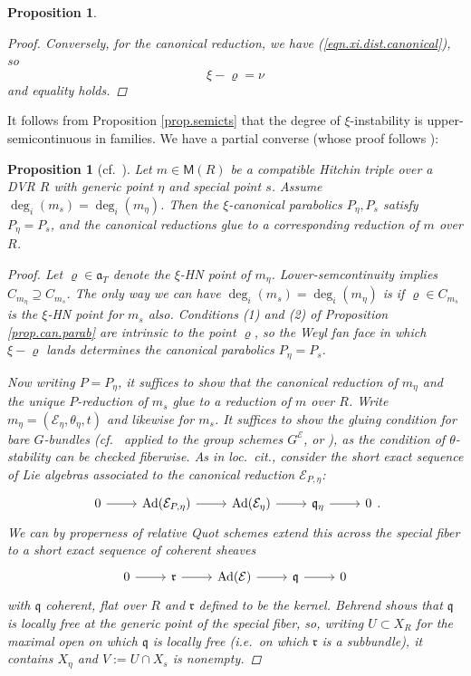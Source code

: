 \documentclass[openany]{amsbook}
\newtheorem{proposition}[theorem]{Proposition}
\theoremstyle{definition}
\theoremstyle{remark}
\numberwithin{equation}{section}
\newcommand{\cE}{\mathcal{E}}
\renewcommand{\-}{\operatorname{-}}
\renewcommand{\a}{\mathfrak{a}}
\newcommand{\fr}{\mathfrak{r}}
\newcommand{\on}[1]{\operatorname{#1}}
\newcommand{\bM}{\mathsf{M}}
\newcommand{\fq}{\mathfrak{q}}
\newcommand{\Ad}{\on{Ad}}
\begin{document}
\begin{proposition}
\begin{proof}
        Conversely, for the canonical reduction, we have (\ref{eqn.xi.dist.canonical}), so
        $$
            \xi - \varrho = \nu
        $$
        and equality holds. 
    \end{proof}
\end{proposition}



It follows from Proposition \ref{prop.semicts} that the degree of $\xi$-instability is upper-semicontinuous in families. We have a partial converse (whose proof follows \cite[7.1.3]{behrendthesis}):

\begin{proposition}[{cf.\ \cite[7.1.3]{behrendthesis}}]\label{prop.can.P.loc.const}
    Let $m \in \bM(R)$ be a compatible Hitchin triple over a DVR $R$ with generic point $\eta$ and special point $s$. Assume $\deg_i(m_s) = \deg_i(m_\eta)$. Then the $\xi$-canonical parabolics $P_\eta, P_s$ satisfy $P_\eta = P_s$, and the canonical reductions glue to a corresponding reduction of $m$ over $R$.
    \begin{proof}
        Let $\varrho \in \a_T$ denote the $\xi$-HN point of $m_\eta$. Lower-semcontinuity implies $C_{m_\eta} \supseteq C_{m_s}$. The only way we can have $\deg_i(m_s) = \deg_i(m_\eta)$ is if $\varrho \in C_{m_s}$ is the $\xi$-HN point for $m_s$ also. Conditions (1) and (2) of Proposition \ref{prop.can.parab} are intrinsic to the point $\varrho$, so the Weyl fan face in which $\xi - \varrho$ lands determines the canonical parabolics $P_\eta = P_s$.
        
        Now writing $P = P_\eta$, it suffices to show that the canonical reduction of $m_\eta$ and the unique $P$-reduction of $m_s$ glue to a reduction of $m$ over $R$. Write $m_\eta = (\cE_\eta, \theta_\eta, t)$ and likewise for $m_s$. It suffices to show the gluing condition for bare $G$-bundles (cf.\ \cite[Prop. 7.1.3]{behrendthesis} applied to the group schemes $G^{\cE}$, or \cite[Lemma 4.4.2]{heinlothschmitt}), as the condition of $\theta$-stability can be checked fiberwise. As in \emph{loc.\ cit.}, consider the short exact sequence of Lie algebras associated to the canonical reduction $\cE_{P, \eta}$:
        $$
            \begin{tikzcd}[ampersand replacement=\&]
                0 \ar[r] \& \Ad(\cE_{P, \eta}) \ar[r] \& \Ad(\cE_\eta) \ar[r] \& \fq_\eta \ar[r] \& 0
            \end{tikzcd}.
        $$
        We can by properness of relative Quot schemes extend this across the special fiber to a short exact sequence of coherent sheaves
        $$
            \begin{tikzcd}[ampersand replacement=\&]
                0 \ar[r] \& \fr \ar[r] \& \Ad(\cE) \ar[r] \& \fq \ar[r] \& 0
            \end{tikzcd}
        $$
        with $\fq$ coherent, flat over $R$ and $\fr$ defined to be the kernel. Behrend shows that $\fq$ is locally free at the generic point of the special fiber, so, writing $U \subset X_R$ for the maximal open on which $\fq$ is locally free (i.e.\ on which $\fr$ is a subbundle), it contains $X_\eta$ and $V := U \cap X_s$ is nonempty. 


\end{proof}
\end{proposition}
\end{document}
